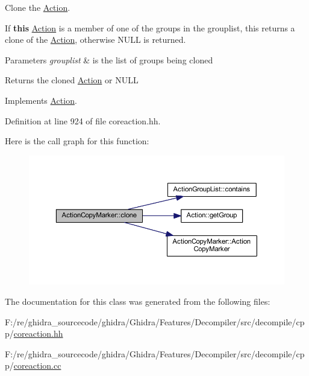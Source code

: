 Clone the \mbox{\hyperlink{class_action}{Action}}. 

If {\bfseries{this}} \mbox{\hyperlink{class_action}{Action}} is a member of one of the groups in the grouplist, this returns a clone of the \mbox{\hyperlink{class_action}{Action}}, otherwise N\+U\+LL is returned. 
\begin{DoxyParams}{Parameters}
{\em grouplist} & is the list of groups being cloned \\
\hline
\end{DoxyParams}
\begin{DoxyReturn}{Returns}
the cloned \mbox{\hyperlink{class_action}{Action}} or N\+U\+LL 
\end{DoxyReturn}


Implements \mbox{\hyperlink{class_action_af8242e41d09e5df52f97df9e65cc626f}{Action}}.



Definition at line 924 of file coreaction.\+hh.

Here is the call graph for this function\+:
\nopagebreak
\begin{figure}[H]
\begin{center}
\leavevmode
\includegraphics[width=350pt]{class_action_copy_marker_adb38f76f4afa65f97dbc971c2096437f_cgraph}
\end{center}
\end{figure}


The documentation for this class was generated from the following files\+:\begin{DoxyCompactItemize}
\item 
F\+:/re/ghidra\+\_\+sourcecode/ghidra/\+Ghidra/\+Features/\+Decompiler/src/decompile/cpp/\mbox{\hyperlink{coreaction_8hh}{coreaction.\+hh}}\item 
F\+:/re/ghidra\+\_\+sourcecode/ghidra/\+Ghidra/\+Features/\+Decompiler/src/decompile/cpp/\mbox{\hyperlink{coreaction_8cc}{coreaction.\+cc}}\end{DoxyCompactItemize}
